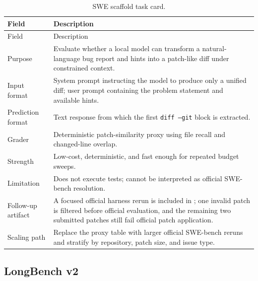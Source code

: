 \documentclass[11pt]{article}
\begin{document}
\begin{longtable}{L{0.24\textwidth}L{0.66\textwidth}}
\caption{SWE scaffold task card.}\label{tab:task_swe_card}\\
\toprule
Field & Description \\
\midrule
\endfirsthead
\toprule
Field & Description \\
\midrule
\endhead
Purpose & Evaluate whether a local model can transform a natural-language bug report and hints into a patch-like diff under constrained context. \\
Input format & System prompt instructing the model to produce only a unified diff; user prompt containing the problem statement and available hints. \\
Prediction format & Text response from which the first \texttt{diff --git} block is extracted. \\
Grader & Deterministic patch-similarity proxy using file recall and changed-line overlap. \\
Strength & Low-cost, deterministic, and fast enough for repeated budget sweeps. \\
Limitation & Does not execute tests; cannot be interpreted as official SWE-bench resolution. \\
Follow-up artifact & A focused official harness rerun is included in ; one invalid patch is filtered before official evaluation, and the remaining two submitted patches still fail official patch application. \\
Scaling path & Replace the proxy table with larger official SWE-bench reruns and stratify by repository, patch size, and issue type. \\
\bottomrule
\end{longtable}

\subsection{LongBench v2}
\end{document}
